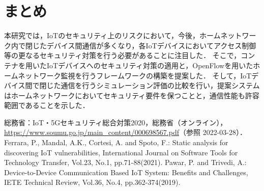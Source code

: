 \documentclass[a4paper,10pt,twocolumn,uplatex]{jsarticle}
\begin{document}
\section{まとめ}
本研究では，IoTのセキュリティ上のリスクにおいて，今後，ホームネットワーク内で閉じたデバイス間通信が多くなり，各IoTデバイスにおいてアクセス制御等の更なるセキュリティ対策を行う必要があることに注目した．
そこで，コンテナを用いたIoTデバイスへのセキュリティ対策の適用と，OpenFlowを用いたホームネットワーク監視を行うフレームワークの構築を提案した．
そして，IoTデバイス間で閉じた通信を行うシミュレーション評価の比較を行い，提案システムはホームネットワークにおいてセキュリティ要件を保つことと，通信性能も許容範囲であることを示した．

\footnotesize{
  \begin{thebibliography}{99}
     総務省：IoT・5Gセキュリティ総合対策2020，総務省（オンライン），
    \url{https://www.soumu.go.jp/main_content/000698567.pdf}（参照 2022-03-28）．
     Ferrara, P., Mandal, A.K., Cortesi, A. and Spoto, F.: Static analysis for discovering IoT vulnerabilities, International Journal on Software Tools for Technology Transfer, Vol.23, No.1, pp.71-88(2021).
     Pawar, P. and Trivedi, A.: Device-to-Device Communication Based IoT System: Benefits and Challenges, IETE Technical Review, Vol.36, No.4, pp.362-374(2019).
  \end{thebibliography}
}

% 
% 

\end{document}
